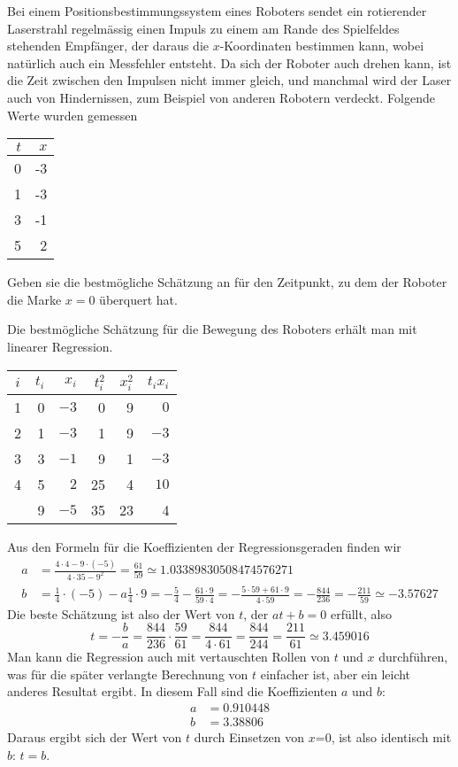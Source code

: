 Bei einem Positionsbestimmungssystem eines Roboters sendet ein rotierender
Laserstrahl regelmässig einen Impuls zu einem am Rande des Spielfeldes
stehenden Empfänger, der daraus die $x$-Koordinaten bestimmen kann,
wobei natürlich auch ein Messfehler entsteht.
Da sich der Roboter auch drehen kann, ist die Zeit zwischen den Impulsen
nicht immer gleich, und manchmal wird der Laser auch von Hindernissen, zum
Beispiel von anderen Robotern verdeckt. Folgende Werte wurden gemessen
\begin{center}
\begin{tabular}{|r|r|}
\hline
$t$&$x$\\
\hline
0&-3\\
1&-3\\
3&-1\\
5&2\\
\hline
\end{tabular}
\end{center}
Geben sie die bestmögliche Schätzung an für den Zeitpunkt,
zu dem der Roboter die Marke $x=0$ überquert hat.


\begin{loesung}
Die bestmögliche Schätzung für die Bewegung des Roboters erhält
man mit linearer Regression.
\begin{center}
\begin{tabular}{|c|rr|rr|r|}
\hline
$i$&$t_i$&$x_i$&$t_i^2$&$x_i^2$&$t_ix_i$\\
\hline
1&0&$-3$& 0&9&$ 0$\\
2&1&$-3$& 1&9&$-3$\\
3&3&$-1$& 9&1&$-3$\\
4&5&$ 2$&25&4&$10$\\
\hline
&9&$-5$&35&23&4\\
\hline
\end{tabular}
\end{center}
Aus den Formeln für die Koeffizienten der Regressionsgeraden finden
wir
\begin{align*}
a&=\frac{4\cdot 4 -9\cdot(-5)}{4\cdot 35-9^2}=\frac{61}{59}
\simeq 1.03389830508474576271
\\
b&=\frac14\cdot (-5)-a\frac14\cdot 9
=-\frac54-\frac{61\cdot 9}{59\cdot 4}
=-\frac{5\cdot 59+61\cdot 9}{4\cdot 59}
=-\frac{844}{236}
=-\frac{211}{59}
\simeq
-3.57627
\end{align*}
Die beste Schätzung ist also der Wert von $t$, der
$at+b=0$ erfüllt, also
\[
t=-\frac{b}{a}=\frac{844}{236}\cdot\frac{59}{61}
=\frac{844}{4\cdot 61}=\frac{844}{244}
=\frac{211}{61}
\simeq 3.459016
\]
Man kann die Regression auch mit vertauschten Rollen von $t$ und $x$
durchführen, was für die später verlangte Berechnung von $t$
einfacher ist, aber ein leicht anderes Resultat ergibt. In diesem
Fall sind die Koeffizienten $a$ und $b$:
\begin{align*}
a&=0.910448\\
b&=3.38806
\end{align*}
Daraus ergibt sich der Wert von $t$ durch Einsetzen von $x$=0, ist
also identisch mit $b$: $t=b$.
\end{loesung}

